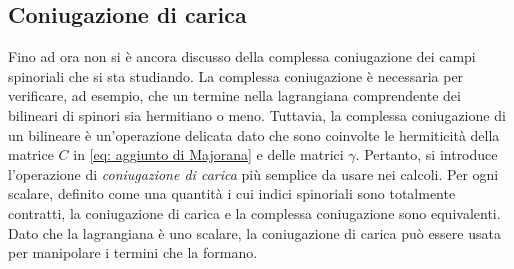 \subsection{Coniugazione di carica}
Fino ad ora non si è ancora discusso della complessa coniugazione dei campi spinoriali che si sta studiando. La complessa coniugazione è necessaria per verificare, ad esempio, che un termine nella lagrangiana comprendente dei bilineari di spinori sia hermitiano o meno. Tuttavia, la complessa coniugazione di un bilineare è un'operazione delicata dato che sono coinvolte le hermiticità della matrice $C$ in \eqref{eq: aggiunto di Majorana} e delle matrici $\gamma$. Pertanto, si introduce l'operazione di \emph{coniugazione di carica} più semplice da usare nei calcoli. Per ogni scalare, definito come una quantità i cui indici spinoriali sono totalmente contratti, la coniugazione di carica e la complessa coniugazione sono equivalenti. Dato che la lagrangiana è uno scalare, la coniugazione di carica può essere usata per manipolare i termini che la formano. 

